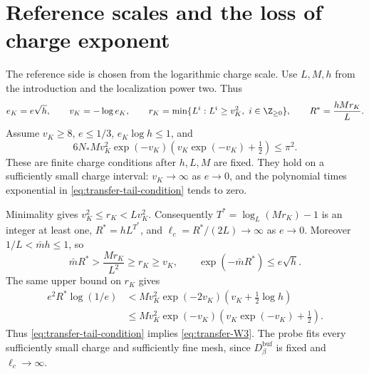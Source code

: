 \section{Reference scales and the loss of charge exponent}\label{sec:vtm-bounds}

The reference side is chosen from the logarithmic charge
scale. Use $L,M,h$ from the introduction and the localization
power two. Thus
\begin{equation}\label{eq:transfer-scale-choice}
 e_K=e\sqrt h,\qquad v_K=-\log e_K,\qquad
 r_K=\min\{L^i:L^i\ge v_K^2,\ i\in\Z_{\ge0}\},
 \qquad R^*=\frac{hMr_K}{L}.
\end{equation}
Assume $v_K\ge8$, $e\le1/3$, $e_K\log h\le1$, and
\begin{equation}\label{eq:transfer-tail-condition}
 6N_*Mv_K^2 \exp(-v_K)
                 \left(v_K\exp(-v_K)+\tfrac12\right)\le\pi^2.
\end{equation}
These are finite charge conditions after $h,L,M$ are fixed.
They hold on a sufficiently small charge interval:
$v_K\to\infty$ as $e\to0$, and the polynomial times
exponential in \eqref{eq:transfer-tail-condition}
tends to zero.

Minimality gives $v_K^2\le r_K<Lv_K^2$.
Consequently $T^*=\log_L(Mr_K)-1$ is an integer at
least one, $R^*=hL^{T^*}$, and
$\ell_c=R^*/(2L)\to\infty$ as $e\to0$.
Moreover $1/L<\bar mh\le1$, so
\begin{equation}\label{eq:transfer-volume-error}
 \bar mR^*>\frac{Mr_K}{L^2}\ge r_K\ge v_K,
 \qquad \exp(-\bar mR^*)\le e\sqrt h.
\end{equation}
The same upper bound on $r_K$ gives
\begin{align*}
 e^2R^*\log(1/e)
 &<Mv_K^2 \exp(-2v_K)
                          (v_K+\tfrac12\log h)\\
 &\le Mv_K^2 \exp(-v_K)
                          (v_K\exp(-v_K)+\tfrac12).
\end{align*}
Thus \eqref{eq:transfer-tail-condition} implies
\eqref{eq:transfer-W3}.
The probe fits every sufficiently small charge and
sufficiently fine mesh, since $D_\beta^{\mathrm{buf}}$
is fixed and $\ell_c\to\infty$.

